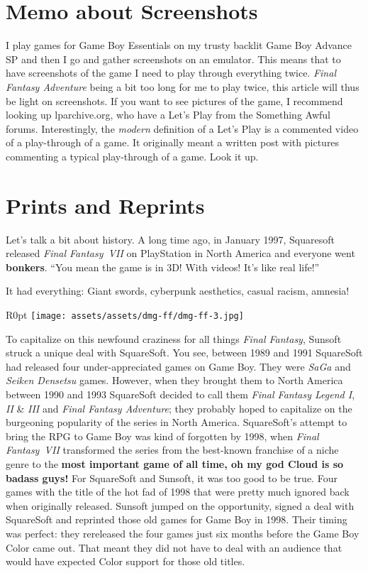 \documentclass{book}
\begin{document}
\FloatBarrier\needspace{10mm}\section*{Memo about Screenshots}\nopagebreak[4]

I play games for Game Boy Essentials on my trusty backlit Game Boy Advance SP and then I go and gather screenshots on an emulator. This means that to have screenshots of the game I need to play through everything twice. \emph{Final Fantasy Adventure} being a bit too long for me to play twice, this article will thus be light on screenshots. If you want to see pictures of the game, I recommend looking up lparchive.org, who have a Let’s Play from the Something Awful forums. Interestingly, the \emph{modern} definition of a Let’s Play is a commented video of a play-through of a game. It originally meant a written post with pictures commenting a typical play-through of a game. Look it up.

\FloatBarrier\needspace{10mm}\section*{Prints and Reprints}\nopagebreak[4]

Let’s talk a bit about history. A long time ago, in January 1997, Squaresoft released \emph{Final Fantasy~VII} on PlayStation in North America and everyone went \textbf{bonkers}. “You mean the game is in 3D! With videos! It’s like real life!”

It had everything: Giant swords, cyberpunk aesthetics, casual racism, amnesia!

\begin{wrapfigure}{R}{0pt} \texttt{[image: assets/assets/dmg-ff/dmg-ff-3.jpg]}\end{wrapfigure}
To capitalize on this newfound craziness for all things \emph{Final Fantasy}, Sunsoft struck a unique deal with SquareSoft. You see, between 1989 and 1991 SquareSoft had released four under-appreciated games on Game Boy. They were \emph{SaGa} and \emph{Seiken Densetsu} games. However, when they brought them to North America between 1990 and 1993 SquareSoft decided to call them \emph{Final Fantasy Legend I}, \emph{II} \& \emph{III} and \emph{Final Fantasy Adventure}; they probably hoped to capitalize on the burgeoning popularity of the series in North America. SquareSoft’s attempt to bring the RPG to Game Boy was kind of forgotten by 1998, when \emph{Final Fantasy~VII} transformed the series from the best-known franchise of a niche genre to the \textbf{most important game of all time, oh my god Cloud is so badass guys!} For SquareSoft and Sunsoft, it was too good to be true. Four games with the title of the hot fad of 1998 that were pretty much ignored back when originally released. Sunsoft jumped on the opportunity, signed a deal with SquareSoft and reprinted those old games for Game Boy in 1998. Their timing was perfect: they rereleased the four games just six months before the Game Boy Color came out. That meant they did not have to deal with an audience that would have expected Color support for those old titles.
\end{document}
